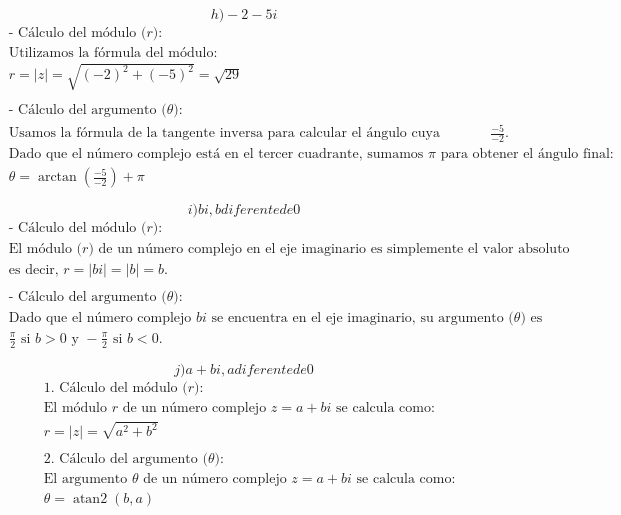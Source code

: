 \documentclass{article}
\begin{document}
\[
h) -2-5i
\]
\begin{align*}
&\text{- Cálculo del módulo (\(r\)):} \\
&\text{Utilizamos la fórmula del módulo:} \\
& r = |z| = \sqrt{(-2)^2 + (-5)^2} = \sqrt{29} \\
& \\
&\text{- Cálculo del argumento (\(\theta\)):} \\
&\text{Usamos la fórmula de la tangente inversa para calcular el ángulo cuya tangente es \(\frac{-5}{-2}\).} \\
&\text{Dado que el número complejo está en el tercer cuadrante, sumamos \(\pi\) para obtener el ángulo final:} \\
& \theta = \arctan\left(\frac{-5}{-2}\right) + \pi \\
& \\
\end{align*}
\newpage
\[
i) bi, b diferente de 0
\]
\begin{align*}
&\text{- Cálculo del módulo (\(r\)):} \\
&\text{El módulo (\(r\)) de un número complejo en el eje imaginario es simplemente el valor absoluto de la parte imaginaria,} \\
&\text{es decir, } r = |bi| = |b| = b. \\
& \\
&\text{- Cálculo del argumento (\(\theta\)):} \\
&\text{Dado que el número complejo } bi \text{ se encuentra en el eje imaginario, su argumento (\(\theta\)) es} \\
&\frac{\pi}{2} \text{ si } b > 0 \text{ y } -\frac{\pi}{2} \text{ si } b < 0. \\
& \\
\end{align*}
\[
j) a+bi, a diferente de 0
\]
\begin{align*}
&\text{1. Cálculo del módulo (\(r\)):} \\
&\text{El módulo } r \text{ de un número complejo } z = a + bi \text{ se calcula como:} \\
& r = |z| = \sqrt{a^2 + b^2} \\
& \\
&\text{2. Cálculo del argumento (\(\theta\)):} \\
&\text{El argumento } \theta \text{ de un número complejo } z = a + bi \text{ se calcula como:} \\
& \theta = \operatorname{atan2}(b, a) \\
& \\
\end{align*}
\newpage
\end{document}
